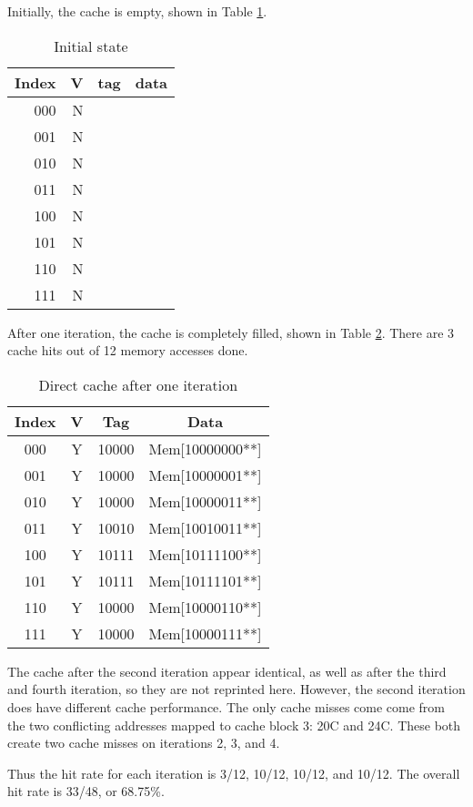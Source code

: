 \documentclass[12pt,letterpaper]{article}
\begin{document}
Initially, the cache is empty, shown in Table \ref{table:empty}.

\begin{table}[h!]
\centering
\begin{tabular}{r|r|r|r}
Index & V & tag & data\\
\hline
000 & N & &\\
001 & N & &\\
010 & N & &\\
011 & N & &\\
100 & N & &\\
101 & N & &\\
110 & N & &\\
111 & N & &\\
\end{tabular}
\caption{Initial state}
\label{table:empty}
\end{table}


After one iteration, the cache is completely filled, shown in Table \ref{table:one}. There are 3 cache hits out of 12 memory
accesses done.

\begin{table}[h!]
\centering
\begin{tabular}{c|c|c|c}
Index & V & Tag & Data\\
\hline
000 & Y & 10000 & Mem[10000000**]\\
001 & Y & 10000 & Mem[10000001**]\\
010 & Y & 10000 & Mem[10000011**]\\
011 & Y & 10010 & Mem[10010011**]\\
100 & Y & 10111 & Mem[10111100**]\\
101 & Y & 10111 & Mem[10111101**]\\
110 & Y & 10000 & Mem[10000110**]\\
111 & Y & 10000 & Mem[10000111**]\\
\end{tabular}
\caption{Direct cache after one iteration}
\label{table:one}
\end{table}

The cache after the second iteration appear identical, as well as after the third and fourth
iteration, so they are not reprinted here. However, the second iteration does have different cache
performance. The only cache misses come come from the two conflicting addresses mapped to cache
block 3: 20C and 24C. These both create two cache misses on iterations 2, 3, and 4.

Thus the hit rate for each iteration is 3/12, 10/12, 10/12, and 10/12. The overall hit rate is
33/48, or 68.75\%.
\end{document}
